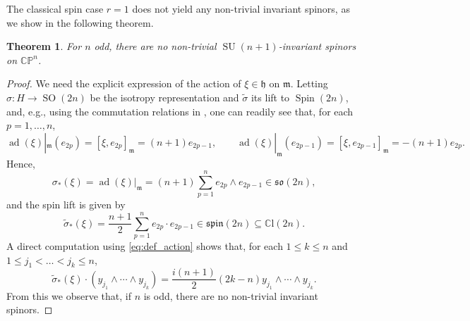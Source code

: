 \documentclass[pdftex]{sigma}
\numberwithin{equation}{section}
\newtheorem{Theorem}{Theorem}[section]
\newcommand{\restr}[1]{|_{#1}}
\DeclareMathOperator{\ad}{ad}
\DeclareMathOperator{\SO}{SO}
\DeclareMathOperator{\Spin}{Spin}
\DeclareMathOperator{\SU}{SU}
\begin{document}
		The classical spin case $r=1$ does not yield any non-trivial invariant spinors, as we show in the following theorem.
		\begin{Theorem} \label{thm:her_classical_spinors}
			For $n$ odd, there are no non-trivial $\SU(n+1)$-invariant spinors on $\mathbb{CP}^{n}$.
		\end{Theorem}
		\begin{proof}
			We need the explicit expression of the action of $\xi \in \mathfrak{h}$ on $\mathfrak{m}$. Letting $\sigma \colon H \to \SO(2n)$ be the isotropy representation and $\widetilde{\sigma}$ its lift to $\Spin(2n)$, and, e.g., using the commutation relations in \cite[p.\ 9]{AHL}, one can readily see that, for each $p = 1, \dots, n$,
			\begin{equation*}
				\ad(\xi)\restr{\mathfrak{m}} (e_{2p}) = [\xi,e_{2p} ]_{\mathfrak{m}} = (n+1) e_{2p-1} , \qquad \ad(\xi)\restr{\mathfrak{m}} (e_{2p-1}) = [\xi,e_{2p-1} ]_{\mathfrak{m}} = - (n+1) e_{2p} .
			\end{equation*}
			Hence,
			\begin{equation*}
				\sigma_* (\xi) = \ad(\xi)\restr{\mathfrak{m}} = (n+1) \sum_{p=1}^{n} e_{2p}\wedge e_{2p-1} \in \mathfrak{so}(2n) ,
			\end{equation*}
			and the spin lift is given by
			\begin{equation*}
				\widetilde{\sigma}_*(\xi) = \frac{n+1}{2} \sum_{p=1}^{n} e_{2p} \cdot e_{2p-1} \in \mathfrak{spin}(2n) \subseteq \mathbb{C}\mathrm{l}(2n) .
			\end{equation*}
			A direct computation using \eqref{eq:def_action} shows that, for each $1 \leq k \leq n$ and $1 \leq j_1 < \dots < j_k \leq n$,
			\[%
				\widetilde{\sigma}_*(\xi) \cdot ( y_{j_1} \wedge \cdots \wedge y_{j_k} ) = \frac{i(n+1)}{2}(2k-n) y_{j_1} \wedge \cdots \wedge y_{j_k} .
			\]
			From this we observe that, if $n$ is odd, there are no non-trivial invariant spinors.
		\end{proof}
		
\end{document}
